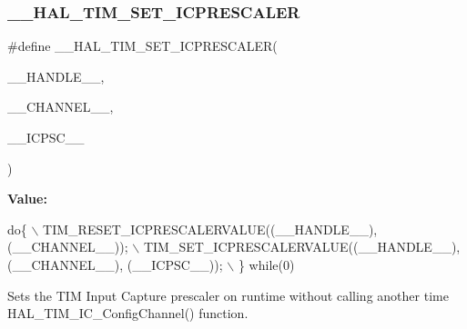 \subsubsection{\texorpdfstring{\+\_\+\+\_\+\+H\+A\+L\+\_\+\+T\+I\+M\+\_\+\+S\+E\+T\+\_\+\+I\+C\+P\+R\+E\+S\+C\+A\+L\+ER}{\_\_HAL\_TIM\_SET\_ICPRESCALER}}
{\footnotesize\ttfamily \#define \+\_\+\+\_\+\+H\+A\+L\+\_\+\+T\+I\+M\+\_\+\+S\+E\+T\+\_\+\+I\+C\+P\+R\+E\+S\+C\+A\+L\+ER(\begin{DoxyParamCaption}\item[{}]{\+\_\+\+\_\+\+H\+A\+N\+D\+L\+E\+\_\+\+\_\+,  }\item[{}]{\+\_\+\+\_\+\+C\+H\+A\+N\+N\+E\+L\+\_\+\+\_\+,  }\item[{}]{\+\_\+\+\_\+\+I\+C\+P\+S\+C\+\_\+\+\_\+ }\end{DoxyParamCaption})}

{\bfseries Value\+:}
\begin{DoxyCode}
\textcolor{keywordflow}{do}\{                                                    \(\backslash\)
                              TIM\_RESET\_ICPRESCALERVALUE((\_\_HANDLE\_\_), (\_\_CHANNEL\_\_));  \(\backslash\)
                              TIM\_SET\_ICPRESCALERVALUE((\_\_HANDLE\_\_), (\_\_CHANNEL\_\_), (\_\_ICPSC\_\_)); \(\backslash\)
                          \} \textcolor{keywordflow}{while}(0)
\end{DoxyCode}


Sets the T\+IM Input Capture prescaler on runtime without calling another time H\+A\+L\+\_\+\+T\+I\+M\+\_\+\+I\+C\+\_\+\+Config\+Channel() function. 


